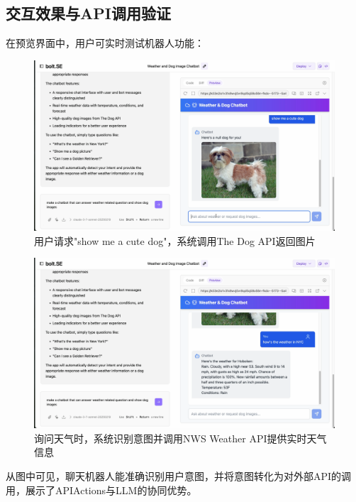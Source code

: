\subsection{交互效果与API调用验证}

在预览界面中，用户可实时测试机器人功能：

\begin{figure}[htbp]
  \centering
  \includegraphics[width=\textwidth]{figures/screenshots/api-actions/demo_dog_preview.png}
  \caption{用户请求"show me a cute dog"，系统调用The Dog API返回图片}
  \label{fig:demo_dog}
\end{figure}

\begin{figure}[htbp]
  \centering
  \includegraphics[width=\textwidth]{figures/screenshots/api-actions/demo_weather_preview.png}
  \caption{询问天气时，系统识别意图并调用NWS Weather API提供实时天气信息}
  \label{fig:demo_weather}
\end{figure}

从图中可见，聊天机器人能准确识别用户意图，并将意图转化为对外部API的调用，展示了APIActions与LLM的协同优势。